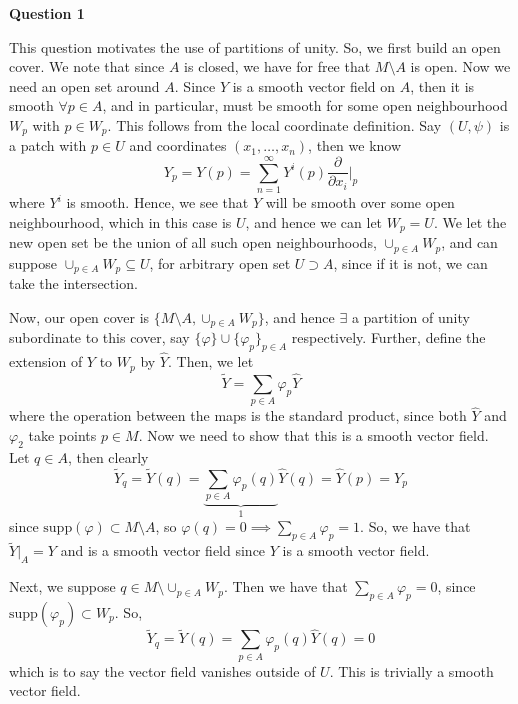 \documentclass[10pt]{article}
\begin{document}
\textbf{Question 1}

This question motivates the use of partitions of unity. So, we first build an open cover. We note that since $A$ is closed, we have for free that $M\setminus A$ is open. Now we need an open set around $A$. Since $Y$ is a smooth vector field on $A$, then it is smooth $\forall p \in A$, and in particular, must be smooth for some open neighbourhood $W_{p}$ with $p\in W_{p}$. This follows from the local coordinate definition. Say $(U,\psi)$ is a patch with $p\in U$ and coordinates $(x_{1},\dots,x_{n})$, then we know
\[ Y_{p} = Y(p) = \sum_{n=1}^{\infty}Y^{i}(p)\frac{\partial}{\partial x_{i}}|_{p} \]
where $Y^{i}$ is smooth. Hence, we see that $Y$ will be smooth over some open neighbourhood, which in this case is $U$, and hence we can let $W_{p} = U$. We let the new open set be the union of all such open neighbourhoods, $\cup_{p\in A}W_{p}$, and can suppose $\cup_{p\in A}W_{p}\subseteq U$, for arbitrary open set $U \supset A$, since if it is not, we can take the intersection.

Now, our open cover is $\{M\setminus A,\cup_{p\in A}W_{p}\}$, and hence $\exists$ a partition of unity subordinate to this cover, say $\{\varphi\}\cup \{\varphi_{p}\}_{p\in A}$ respectively. Further, define the extension of $Y$ to $W_{p}$ by $\hat{Y}$. Then, we let
\[ \tilde{Y} = \sum_{p\in A}\varphi_{p}\hat{Y} \]
where the operation between the maps is the standard product, since both $\hat{Y}$ and $\varphi_{2}$ take points $p\in M$. Now we need to show that this is a smooth vector field. Let $q\in A$, then clearly
\[ \tilde{Y}_{q} = \tilde{Y}(q) = \underbrace{\sum_{p\in A}\varphi_{p}(q)}_{1}\hat{Y}(q) = \hat{Y}(p) = Y_{p}\]
since $\text{supp}(\varphi)\subset M\setminus A$, so $\varphi(q) = 0 \implies \sum_{p\in A}\varphi_{p} = 1$. So, we have that $\tilde{Y}|_{A} = Y$ and is a smooth vector field since $Y$ is a smooth vector field.

Next, we suppose $q \in M\setminus \cup_{p\in A}W_{p}$. Then we have that $\sum_{p\in A}\varphi_{p} = 0$, since $\text{supp}(\varphi_{p})\subset W_{p}$. So,
\[ \tilde{Y}_{q} = \tilde{Y}(q) = \sum_{p\in A}\varphi_{p}(q)\hat{Y}(q) = 0 \]
which is to say the vector field vanishes outside of $U$. This is trivially a smooth vector field.
\end{document}
